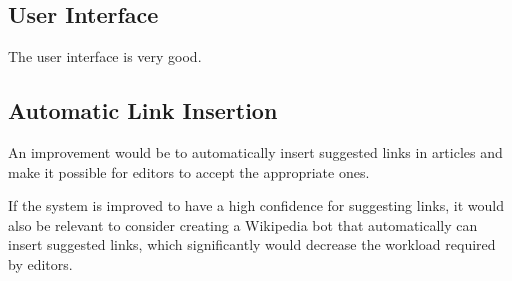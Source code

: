 \subsection{User Interface}
The user interface is very good. 

\subsection{Automatic Link Insertion}
An improvement would be to automatically insert suggested links in articles and make it possible for editors to accept the appropriate ones.

If the system is improved to have a high confidence for suggesting links, it would also be relevant to consider creating a Wikipedia bot that automatically can insert suggested links, which significantly would decrease the workload required by editors.

